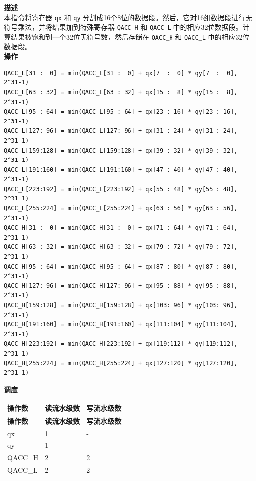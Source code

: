 \textbf{描述}\\
本指令将寄存器 \lstinline{qx} 和 \lstinline{qy} 分割成16个8位的数据段。然后，它对16组数据段进行无符号乘法，并将结果加到特殊寄存器 \lstinline{QACC_H} 和 \lstinline{QACC_L} 中的相应32位数据段。计算结果被饱和到一个32位无符号数，然后存储在 \lstinline{QACC_H} 和 \lstinline{QACC_L} 中的相应32位数据段。\\

\textbf{操作}\\

\begin{lstlisting}
QACC_L[31 :  0] = min(QACC_L[31 :  0] + qx[7  :  0] * qy[7  :  0], 2^31-1)
QACC_L[63 : 32] = min(QACC_L[63 : 32] + qx[15 :  8] * qy[15 :  8], 2^31-1)
QACC_L[95 : 64] = min(QACC_L[95 : 64] + qx[23 : 16] * qy[23 : 16], 2^31-1)
QACC_L[127: 96] = min(QACC_L[127: 96] + qx[31 : 24] * qy[31 : 24], 2^31-1)
QACC_L[159:128] = min(QACC_L[159:128] + qx[39 : 32] * qy[39 : 32], 2^31-1)
QACC_L[191:160] = min(QACC_L[191:160] + qx[47 : 40] * qy[47 : 40], 2^31-1)
QACC_L[223:192] = min(QACC_L[223:192] + qx[55 : 48] * qy[55 : 48], 2^31-1)
QACC_L[255:224] = min(QACC_L[255:224] + qx[63 : 56] * qy[63 : 56], 2^31-1)
QACC_H[31 :  0] = min(QACC_H[31 :  0] + qx[71 : 64] * qy[71 : 64], 2^31-1)
QACC_H[63 : 32] = min(QACC_H[63 : 32] + qx[79 : 72] * qy[79 : 72], 2^31-1)
QACC_H[95 : 64] = min(QACC_H[95 : 64] + qx[87 : 80] * qy[87 : 80], 2^31-1)
QACC_H[127: 96] = min(QACC_H[127: 96] + qx[95 : 88] * qy[95 : 88], 2^31-1)
QACC_H[159:128] = min(QACC_H[159:128] + qx[103: 96] * qy[103: 96], 2^31-1)
QACC_H[191:160] = min(QACC_H[191:160] + qx[111:104] * qy[111:104], 2^31-1)
QACC_H[223:192] = min(QACC_H[223:192] + qx[119:112] * qy[119:112], 2^31-1)
QACC_H[255:224] = min(QACC_H[255:224] + qx[127:120] * qy[127:120], 2^31-1)

\end{lstlisting}

\textbf{调度}\\
\begin{longtable}[c]{|l|l|l|}
    \hline
    \rowcolor{lightgray}
    \textbf{操作数} & \textbf{读流水级数} & \textbf{写流水级数} \\\hline
    \endfirsthead
    \hline
    \rowcolor{lightgray}
     \textbf{操作数} & \textbf{读流水级数} & \textbf{写流水级数} \\\hline
    \endhead
    \hline
    \endfoot

     qx & 1 & - \\\hline
     qy & 1 & - \\\hline
     QACC\_H & 2 & 2 \\\hline
     QACC\_L & 2 & 2

\end{longtable}

